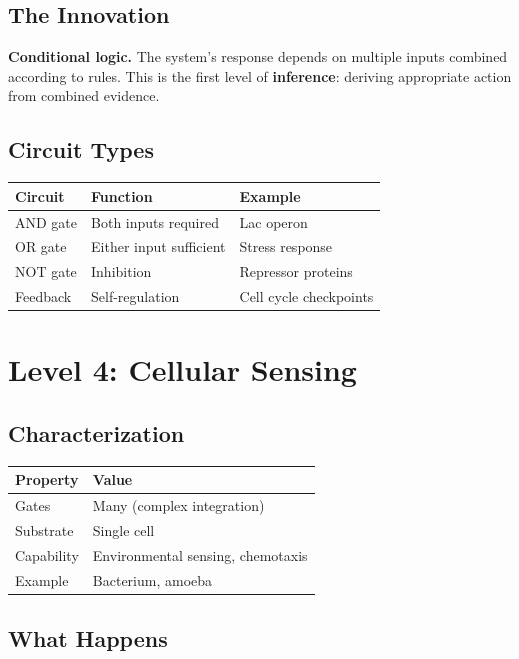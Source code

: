 \documentclass[
  11pt,
  letterpaper,
  twoside,
  openright]{book}
\begin{document}
\subsection{The Innovation}\label{the-innovation-1}

\textbf{Conditional logic.} The system's response depends on multiple
inputs combined according to rules. This is the first level of
\textbf{inference}: deriving appropriate action from combined evidence.

\subsection{Circuit Types}\label{circuit-types}

\begin{longtable}[]{@{}lll@{}}
\toprule\noalign{}
Circuit & Function & Example \\
\midrule\noalign{}
\endhead
\bottomrule\noalign{}
\endlastfoot
AND gate & Both inputs required & Lac operon \\
OR gate & Either input sufficient & Stress response \\
NOT gate & Inhibition & Repressor proteins \\
Feedback & Self-regulation & Cell cycle checkpoints \\
\end{longtable}

\section{Level 4: Cellular Sensing}\label{level-4-cellular-sensing}

\subsection{Characterization}\label{characterization-4}

\begin{longtable}[]{@{}ll@{}}
\toprule\noalign{}
Property & Value \\
\midrule\noalign{}
\endhead
\bottomrule\noalign{}
\endlastfoot
Gates & Many (complex integration) \\
Substrate & Single cell \\
Capability & Environmental sensing, chemotaxis \\
Example & Bacterium, amoeba \\
\end{longtable}

\subsection{What Happens}\label{what-happens-4}
\end{document}
